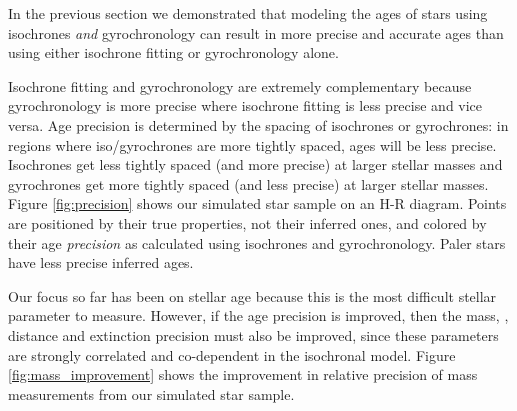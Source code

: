 




In the previous section we demonstrated that modeling the ages of stars using
isochrones {\it and} gyrochronology can result in more precise and accurate
ages than using either isochrone fitting or gyrochronology alone.

Isochrone fitting and gyrochronology are extremely complementary because
gyrochronology is more precise where isochrone fitting is less precise and
vice versa.
Age precision is determined by the spacing of isochrones or gyrochrones: in
regions where iso/gyrochrones are more tightly spaced, ages will be less
precise.
Isochrones get less tightly spaced (and more precise) at larger stellar masses
and gyrochrones get more tightly spaced (and less precise) at larger stellar
masses.
Figure \ref{fig:precision} shows our simulated star sample on an H-R diagram.
Points are positioned by their true properties, not their inferred ones, and
colored by their age {\it precision} as calculated using isochrones and
gyrochronology.
Paler stars have less precise inferred ages.

Our focus so far has been on stellar age because this is the most difficult
stellar parameter to measure.
However, if the age precision is improved, then the mass, \feh, distance and
extinction precision must also be improved, since these parameters are
strongly correlated and co-dependent in the isochronal model.
Figure \ref{fig:mass_improvement} shows the improvement in relative precision
of mass measurements from our simulated star sample.

